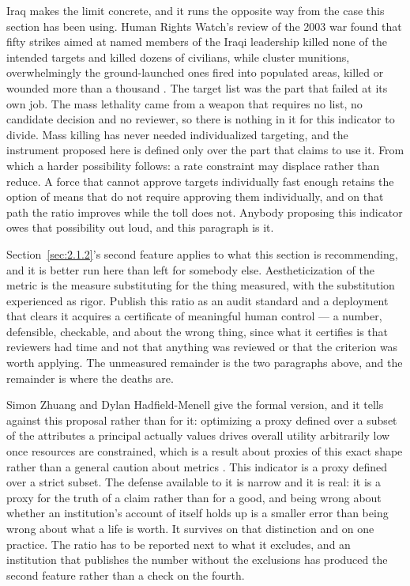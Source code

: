 Iraq makes the limit concrete, and it runs the opposite way from the case this section has been using. Human Rights Watch's review of the 2003 war found that fifty strikes aimed at named members of the Iraqi leadership killed none of the intended targets and killed dozens of civilians, while cluster munitions, overwhelmingly the ground-launched ones fired into populated areas, killed or wounded more than a thousand \autocite{hrw2003offtarget}. The target list was the part that failed at its own job. The mass lethality came from a weapon that requires no list, no candidate decision and no reviewer, so there is nothing in it for this indicator to divide. Mass killing has never needed individualized targeting, and the instrument proposed here is defined only over the part that claims to use it. From which a harder possibility follows: a rate constraint may displace rather than reduce. A force that cannot approve targets individually fast enough retains the option of means that do not require approving them individually, and on that path the ratio improves while the toll does not. Anybody proposing this indicator owes that possibility out loud, and this paragraph is it.

Section~\ref{sec:2.1.2}'s second feature applies to what this section is recommending, and it is better run here than left for somebody else. Aestheticization of the metric is the measure substituting for the thing measured, with the substitution experienced as rigor. Publish this ratio as an audit standard and a deployment that clears it acquires a certificate of meaningful human control — a number, defensible, checkable, and about the wrong thing, since what it certifies is that reviewers had time and not that anything was reviewed or that the criterion was worth applying. The unmeasured remainder is the two paragraphs above, and the remainder is where the deaths are.

Simon Zhuang and Dylan Hadfield-Menell give the formal version, and it tells against this proposal rather than for it: optimizing a proxy defined over a subset of the attributes a principal actually values drives overall utility arbitrarily low once resources are constrained, which is a result about proxies of this exact shape rather than a general caution about metrics \autocite{zhuang2020consequences}. This indicator is a proxy defined over a strict subset. The defense available to it is narrow and it is real: it is a proxy for the truth of a claim rather than for a good, and being wrong about whether an institution's account of itself holds up is a smaller error than being wrong about what a life is worth. It survives on that distinction and on one practice. The ratio has to be reported next to what it excludes, and an institution that publishes the number without the exclusions has produced the second feature rather than a check on the fourth.

